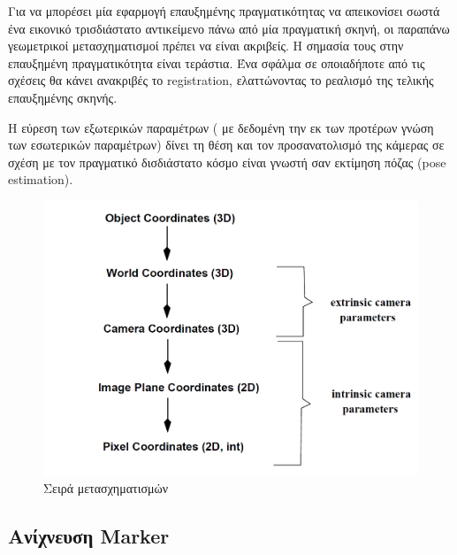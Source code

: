 Για να μπορέσει μία εφαρμογή επαυξημένης πραγματικότητας να απεικονίσει σωστά ένα εικονικό τρισδιάστατο αντικείμενο πάνω από μία πραγματική σκηνή, οι παραπάνω γεωμετρικοί μετασχηματισμοί πρέπει να είναι ακριβείς. H σημασία τους στην επαυξημένη πραγματικότητα είναι τεράστια. Ένα σφάλμα σε οποιαδήποτε από τις σχέσεις θα κάνει ανακριβές το registration, ελαττώνοντας το ρεαλισμό της τελικής επαυξημένης σκηνής. 


Η εύρεση των εξωτερικών παραμέτρων ( με δεδομένη την εκ των προτέρων γνώση των εσωτερικών παραμέτρων) δίνει τη θέση και τον προσανατολισμό της κάμερας σε σχέση με τον πραγματικό δισδιάστατο κόσμο είναι γνωστή σαν εκτίμηση πόζας (pose estimation).



\begin{figure}[H]
    \centering
    \includegraphics[scale=0.7, angle=0]{Files/Figures/coordinatesDiagram.png}
    \caption[Σειρά μετασχηματισμών]{ Σειρά μετασχηματισμών}
    \label{fig:coordinatesDiagram}
\end{figure}


\subsection{Ανίχνευση Marker}




